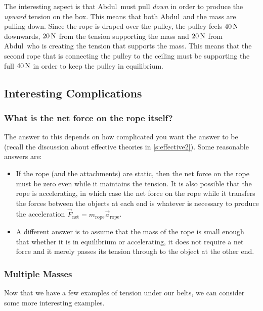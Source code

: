 \documentclass[11pt,letter,openany,makeidx]{book}
\newcommand{\mautoreturn}[1]{\note{Return to \protect{\autoref{#1}}.}}
\newcommand{\studentA}{Abdul}       \newcommand{\massA}{\mbox{$85.0\unit{kg}$}}
\begin{document}
\noindent
The interesting aspect is that \studentA\ must pull \textit{down} in order to produce the \textit{upward} tension on the box.  This means that both \studentA\ and the mass are pulling down.  Since the rope is draped over the pulley, the pulley feels $40\,\mathrm{N}$ downwards, $20\,\mathrm{N}$ from the tension supporting the mass and $20\,\mathrm{N}$ from \studentA\ who is creating the tension that supports the mass.  This means that the second rope that is connecting the pulley to the ceiling must be supporting the full $40\,\mathrm{N}$ in order to keep the pulley in equilibrium.



\subsection{Interesting Complications}

\subsubsection{What is the net force on the rope itself?}
The answer to this depends on how complicated you want the answer to be (recall the discussion about effective theories in \autoref{s:effective2}).  Some reasonable answers are:
\begin{itemize}
\item If the rope (and the attachments) are static, then the net force on the rope must be zero even while it maintains the tension.  It is also possible that the rope is accelerating, in which case the net force on the rope while it transfers the forces between the objects at each end is whatever is necessary to produce the acceleration $\vec F_\mathrm{net} = m_\mathrm{rope} \vec a_\mathrm{rope}$.
\item A different answer is to assume that the mass of the rope is small enough that whether it is in equilibrium or accelerating, it does not require a net force and it merely passes its tension through to the object at the other end.
\end{itemize}

\subsubsection{Multiple Masses}\label{sss:multiple.mass}\mautoreturn{ss:tension.support}

Now that we have a few examples of tension under our belts, we can consider some more interesting examples.
\end{document}

